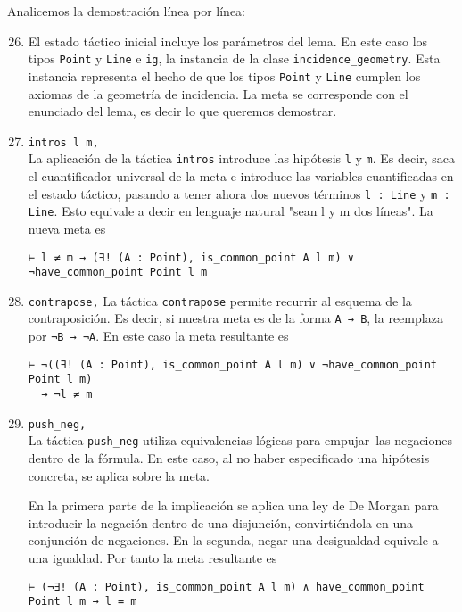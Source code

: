 Analicemos la demostración línea por línea:
\begin{enumerate}[label=L.\arabic*, topsep=0mm]
	\setcounter{enumi}{25}

	\item El estado táctico inicial incluye los parámetros del lema. En este
	      caso los tipos \lstinline{Point} y \lstinline{Line} e \lstinline{ig}, la
	      instancia de la clase \lstinline{incidence_geometry}. Esta instancia
	      representa el hecho de que los tipos \lstinline{Point} y
	      \lstinline{Line} cumplen los axiomas de la geometría de incidencia. La
	      meta se corresponde con el enunciado del lema, es decir lo que queremos
	      demostrar.

	\item \lstinline{intros l m,}\\[.5em]
	      La aplicación de la táctica \lstinline{intros}
	      introduce las hipótesis \lstinline{l} y \lstinline{m}. Es decir, saca el
	      cuantificador universal de la meta e introduce las variables cuantificadas
	      en el estado táctico, pasando a tener ahora dos nuevos términos
	      \lstinline{l : Line} y \lstinline{m : Line}.
	      Esto equivale a decir en lenguaje natural "sean l y m dos líneas".
	      La nueva meta es
	      \begin{lstlisting}
⊢ l ≠ m → (∃! (A : Point), is_common_point A l m) ∨ ¬have_common_point Point l m
\end{lstlisting}

	\item \lstinline{contrapose,} La táctica \lstinline{contrapose} permite
	      recurrir al esquema de la contraposición. Es decir, si nuestra meta es
	      de la forma \lstinline{A → B}, la reemplaza por \lstinline{¬B → ¬A}. En
	      este caso la meta resultante es
	      \begin{lstlisting}
⊢ ¬((∃! (A : Point), is_common_point A l m) ∨ ¬have_common_point Point l m) 
  → ¬l ≠ m
\end{lstlisting}

	\item \lstinline{push_neg, }\\[.5em] La táctica \lstinline{push_neg} utiliza
	      equivalencias lógicas para \guillemotleft empujar\guillemotright\ las
	      negaciones dentro de la fórmula. En este caso, al no haber
	      especificado una hipótesis concreta, se aplica sobre la meta.

	      En la primera parte de la implicación se aplica una ley de De Morgan para
	      introducir la negación dentro de una disjunción, convirtiéndola en una
	      conjunción de negaciones. En la segunda, negar una desigualdad equivale a
	      una igualdad. Por tanto la meta resultante es
	      \begin{lstlisting}
⊢ (¬∃! (A : Point), is_common_point A l m) ∧ have_common_point Point l m → l = m
\end{lstlisting}


\end{enumerate}
